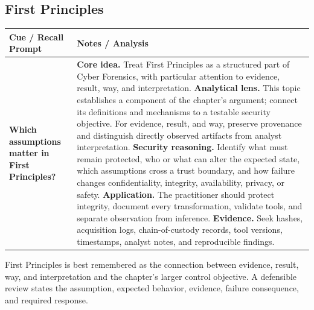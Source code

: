\documentclass[11pt]{article}
\newcommand{\CornellHeader}{%
\rowcolor{Navy}\color{white}\bfseries Cue / Recall Prompt & \color{white}\bfseries Notes / Analysis\\\hline}
\newcommand{\CornellRow}[2]{%
\cellcolor{CueGray}\RaggedRight\textbf{#1} & \RaggedRight #2\\\hline}
\begin{document}
\subsection*{First Principles}
\begin{longtable}{>{\RaggedRight\arraybackslash}p{}|>{\RaggedRight\arraybackslash}p{}}
\CornellHeader
\CornellRow{Which assumptions matter in First Principles?}{\textbf{Core idea.} Treat First Principles as a structured part of Cyber Forensics, with particular attention to evidence, result, way, and interpretation. \textbf{Analytical lens.} This topic establishes a component of the chapter's argument; connect its definitions and mechanisms to a testable security objective. For evidence, result, and way, preserve provenance and distinguish directly observed artifacts from analyst interpretation. \textbf{Security reasoning.} Identify what must remain protected, who or what can alter the expected state, which assumptions cross a trust boundary, and how failure changes confidentiality, integrity, availability, privacy, or safety. \textbf{Application.} The practitioner should protect integrity, document every transformation, validate tools, and separate observation from inference. \textbf{Evidence.} Seek hashes, acquisition logs, chain-of-custody records, tool versions, timestamps, analyst notes, and reproducible findings.}
\end{longtable}
\begin{topicsummary}
First Principles is best remembered as the connection between evidence, result, way, and interpretation and the chapter's larger control objective. A defensible review states the assumption, expected behavior, evidence, failure consequence, and required response.
\end{topicsummary}
\end{document}
